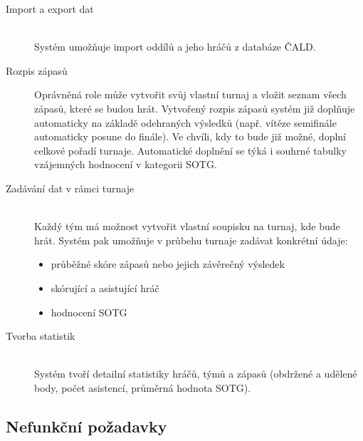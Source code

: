 \documentclass[thesis=B,czech]{FITthesis}[2012/06/26]
\begin{document}
\begin{description}
  \item[Import a export dat] \hfill \\
  Systém umožňuje import oddílů a jeho hráčů z databáze ČALD.

  \item[Rozpis zápasů] \hfill 
  Oprávněná role může vytvořit svůj vlastní turnaj a vložit seznam všech zápasů,
  které se budou hrát. Vytvořený rozpis zápasů systém již doplňuje automaticky na základě
  odehraných výsledků (např. vítěze semifinále automaticky posune do finále). Ve chvíli,
  kdy to bude již možné, doplní celkové pořadí turnaje. Automatické doplnění se týká i 
  souhrné tabulky vzájemných hodnocení v kategorii SOTG.

  \item[Zadávání dat v rámci turnaje] \hfill \\
  Každý tým má možnost vytvořit vlastní soupisku na turnaj, kde bude hrát. Systém pak umožňuje
  v průbehu turnaje zadávat konkrétní údaje:
  \begin{itemize}
    \item průběžné skóre zápasů nebo jejich závěrečný výsledek
    \item skórující a asistující hráč
    \item hodnocení SOTG
  \end{itemize}
  
  \item[Tvorba statistik] \hfill \\
  Systém tvoří detailní statistiky hráčů, týmů a zápasů (obdržené a udělené body,
  počet asistencí, průměrná hodnota SOTG).
\end{description}

\subsection{Nefunkční požadavky}

\end{document}
